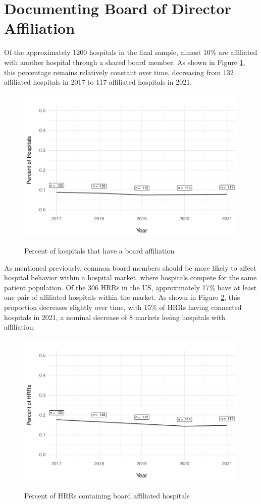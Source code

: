 \documentclass[12pt]{article}
\begin{document}
    \section{Documenting Board of Director Affiliation}


    Of the approximately 1200 hospitals in the final sample, almost 10\% are affiliated with another hospital through a shared board member. As shown in Figure \ref{fig:connected_percent}, this percentage remains relatively constant over time, decreasing from 132 affiliated hospitals in 2017 to 117 affiliated hospitals in 2021. 

    \begin{figure}[ht!]
        \centering
        \caption{Percent of hospitals that have a board affiliation}
        \includegraphics[width=.8\textwidth]{Objects/connected_percent.pdf}
        \label{fig:connected_percent}
    \end{figure}

    As mentioned previously, common board members should be more likely to affect hospital behavior within a hospital market, where hospitals compete for the same patient population. Of the 306 HRRs in the US, approximately 17\% have at least one pair of affiliated hospitals within the market. As shown in Figure \ref{fig:connected_HRR_percent}, this proportion decreases slightly over time, with 15\% of HRRs having connected hospitals in 2021, a nominal decrease of 8 markets losing hospitals with affiliation.  


    \begin{figure}[ht!]
        \centering
        \caption{Percent of HRRs containing board affiliated hospitals}
        \includegraphics[width=.8\textwidth]{Objects/connected_HRR_percent.pdf}
        \label{fig:connected_HRR_percent}
    \end{figure}
\end{document}
